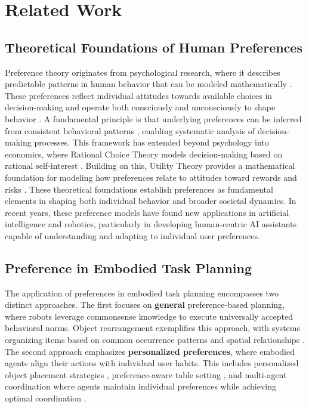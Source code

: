 \section{Related Work}
\subsection{Theoretical Foundations of Human Preferences}

Preference theory originates from psychological research, where it describes predictable patterns in human behavior that can be modeled mathematically \citep{kahneman1982psychology}. These preferences reflect individual attitudes towards available choices in decision-making \citep{lichtenstein2006construction} and operate both consciously and unconsciously to shape behavior \citep{coppin2010m}. A fundamental principle is that underlying preferences can be inferred from consistent behavioral patterns \citep{sen1973behaviour}, enabling systematic analysis of decision-making processes. This framework has extended beyond psychology into economics, where Rational Choice Theory \citep{scott2000rational} models decision-making based on rational self-interest \citep{zey1998rational}. Building on this, Utility Theory provides a mathematical foundation for modeling how preferences relate to attitudes toward rewards and risks \citep{mongin1998expected, aleskerov2007utility}. These theoretical foundations establish preferences as fundamental elements in shaping both individual behavior and broader societal dynamics. In recent years, these preference models have found new applications in artificial intelligence and robotics, particularly in developing human-centric AI assistants capable of understanding and adapting to individual user preferences.

\subsection{Preference in Embodied Task Planning}

The application of preferences in embodied task planning encompasses two distinct approaches. The first focuses on \textbf{general} preference-based planning, where robots leverage commonsense knowledge to execute universally accepted behavioral norms. Object rearrangement exemplifies this approach, with systems organizing items based on common occurrence patterns and spatial relationships \citep{taniguchi2021autonomous,sarch2022tidee}. The second approach emphasizes \textbf{personalized preferences}, where embodied agents align their actions with individual user habits. This includes personalized object placement strategies \citep{abdo2015robot,kapelyukh2022my,wu2023tidybot}, preference-aware table setting \citep{puig2020watch}, and multi-agent coordination where agents maintain individual preferences while achieving optimal coordination \citep{shu2018m}.

